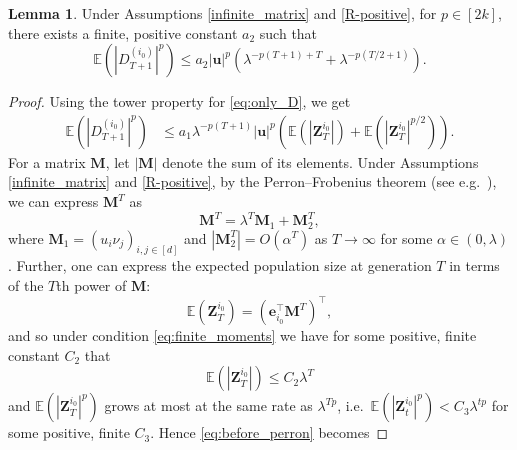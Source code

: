 \documentclass[preprint,3p,12pt]{elsarticle}
\theoremstyle{definition}
\newtheorem{lemma}{Lemma}
\begin{document}
\begin{lemma} \label{lemma:E_D-unconditional}
Under Assumptions \ref{infinite_matrix} and \ref{R-positive}, for $p \in [2k]$, there exists a finite, positive constant $a_2$ such that
    \begin{equation}
        \mathbb{E}(|D_{T+1}^{(i_0)}|^p) \le a_2 |\boldsymbol{u}|^p\left(\lambda^{-p(T+1)+T} + \lambda^{-p(T/2+1)}\right).
    \end{equation}
\end{lemma}
\begin{proof}
Using the tower property for %
\eqref{eq:only_D}, we get
\begin{align}
   \mathbb{E}(|D_{T+1}^{(i_0)}|^p) &\le %
   a_1\lambda^{-p(T+1)}|\boldsymbol{u}|^{p}\left(\mathbb{E}(|\boldsymbol{Z}_T^{i_0}|) + \mathbb{E}\left(|\boldsymbol{Z}_T^{i_0}|^{p/2} \right)\right). \label{eq:before_perron}
\end{align}
For a matrix $\boldsymbol{M}$, let $|\boldsymbol{M}|$ denote the sum of its elements. Under Assumptions \ref{infinite_matrix} and \ref{R-positive}, by the Perron--Frobenius theorem (see e.g.\ \cite[Theorem II.5.1]{harris1963}), we can express $\boldsymbol{M}^T$ as
\begin{equation*}
    \boldsymbol{M}^T = \lambda^T \boldsymbol{M}_1 +  \boldsymbol{M}_2^T,
\end{equation*}
where $\boldsymbol{M}_1 = (u_i \nu_j)_{i,j \in [d]}$ and $|\boldsymbol{M}_2^T| = O(\alpha^T)$ as $T\to\infty$ for some $\alpha \in (0,\lambda)$. Further, one can express the expected population size at generation $T$ in terms of the $T$th power of $\boldsymbol{M}$:
\begin{equation*}
\mathbb{E}(\boldsymbol{Z}_T^{i_0}) = (\boldsymbol{e}_{i_0}^{\top} \boldsymbol{M}^T)^{\top},
\end{equation*}
and so under condition \eqref{eq:finite_moments} we have for some positive, finite constant $C_2$ that 
\begin{equation}
    \mathbb{E}(|\boldsymbol{Z}_T^{i_0}|) \le C_2 \lambda^T  \label{eq:frobenius}
\end{equation}
and $\mathbb{E}(|\boldsymbol{Z}_T^{i_0}|^p)$ grows at most at the same rate as $\lambda^{Tp}$,  i.e.\ $\mathbb{E}(|\boldsymbol{Z}_t^{i_0}|^p)< C_3 \lambda^{tp}$ for some positive, finite $C_3$. Hence \eqref{eq:before_perron} becomes %

\end{proof}
\end{document}
